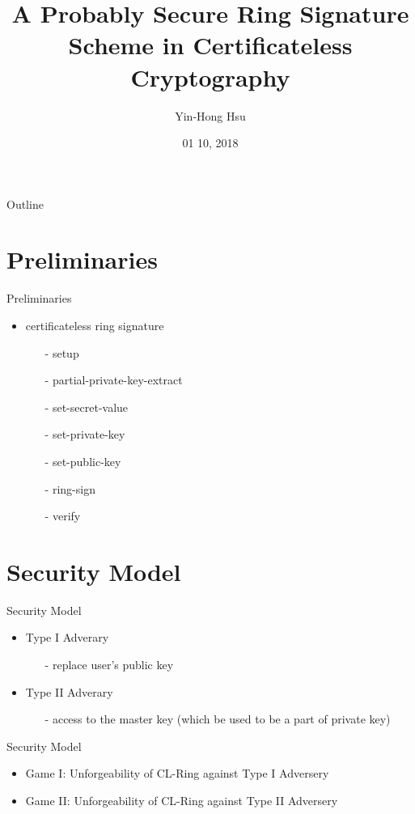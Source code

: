 \documentclass{beamer}
\title {
    A Probably Secure Ring Signature Scheme in Certificateless Cryptography \cite{2017arXiv171209145Z}
}
\author {
    Yin-Hong Hsu
}
\date {
    01 10, 2018
}
\begin{document}
\begin{frame}
    \titlepage
\end{frame}


\begin{frame}{Outline}
    \tableofcontentsgather
    \tableofcontents
\end{frame}

\section{Preliminaries}
\begin{frame} {Preliminaries} 
    \begin{itemize}
        \item {certificateless ring signature}
        \begin{itemize}
                \item [-]{setup}
                \item [-]{partial-private-key-extract}
                \item [-]{set-secret-value}
                \item [-]{set-private-key}
                \item [-]{set-public-key}
                \item [-]{ring-sign}
                \item [-]{verify}
        \end{itemize}
    \end{itemize}
\end{frame}
\section{Security Model}
\begin{frame}{Security Model}
    \begin{itemize}
        \item {Type I Adverary}
        \begin{itemize}
                \item [-]{replace user's public key}
        \end{itemize}
        \item {Type II Adverary}
        \begin{itemize}
                \item [-]{access to the master key (which be used to be a part of private key)}
        \end{itemize}
    \end{itemize}
\end{frame}
\begin{frame}{Security Model}
    \begin{itemize}
        \item {Game I: Unforgeability of CL-Ring against Type I Adversery}
        \item {Game II: Unforgeability of CL-Ring against Type II Adversery}
    \end{itemize}
\end{frame}
\end{document}
